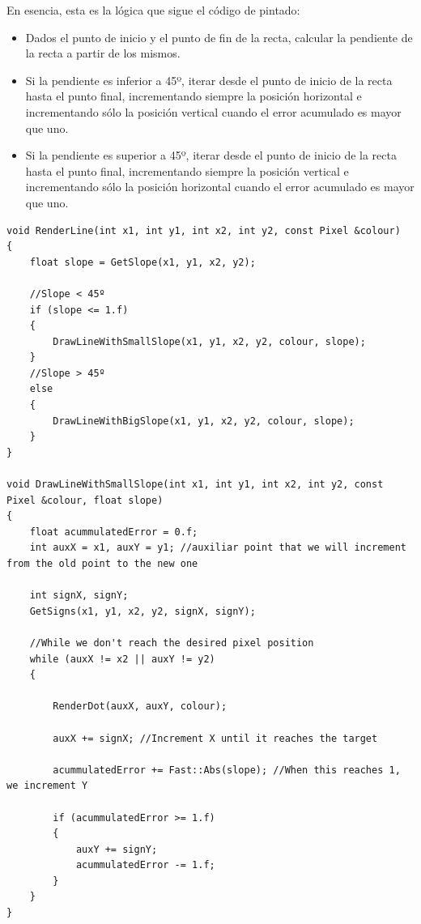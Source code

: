 En esencia, esta es la lógica que sigue el código de pintado:

\begin{itemize}
	\item Dados el punto de inicio y el punto de fin de la recta, calcular la pendiente de la recta a partir de los mismos.
	\item Si la pendiente es inferior a 45º, iterar desde el punto de inicio de la recta hasta el punto final, incrementando siempre la posición horizontal e incrementando sólo la posición vertical cuando el error acumulado es mayor que uno.
	\item Si la pendiente es superior a 45º, iterar desde el punto de inicio de la recta hasta el punto final, incrementando siempre la posición vertical e incrementando sólo la posición horizontal cuando el error acumulado es mayor que uno.
\end{itemize}

\begin{lstlisting}[style=C-color, caption={Versión simplificada y reducida del código para dibujar líneas en pantalla},label=cod:drawline]
void RenderLine(int x1, int y1, int x2, int y2, const Pixel &colour)
{
    float slope = GetSlope(x1, y1, x2, y2);

    //Slope < 45º
    if (slope <= 1.f)
    {
        DrawLineWithSmallSlope(x1, y1, x2, y2, colour, slope);
    }
    //Slope > 45º
    else
    {
        DrawLineWithBigSlope(x1, y1, x2, y2, colour, slope);
    }
}

void DrawLineWithSmallSlope(int x1, int y1, int x2, int y2, const Pixel &colour, float slope)
{
    float acummulatedError = 0.f;  
    int auxX = x1, auxY = y1; //auxiliar point that we will increment from the old point to the new one

    int signX, signY;
    GetSigns(x1, y1, x2, y2, signX, signY);

    //While we don't reach the desired pixel position
    while (auxX != x2 || auxY != y2)
    {

        RenderDot(auxX, auxY, colour);
        
        auxX += signX; //Increment X until it reaches the target

        acummulatedError += Fast::Abs(slope); //When this reaches 1, we increment Y

        if (acummulatedError >= 1.f)
        {
            auxY += signY;
            acummulatedError -= 1.f;
        }
    }
}
\end{lstlisting}

